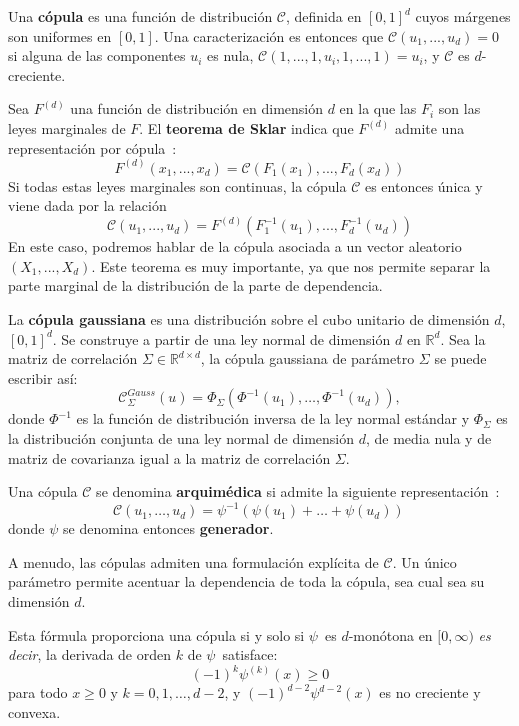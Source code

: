 \begin{f}[Cópula]
	Una \textbf{cópula} es una función de distribución  \(\mathcal{C}\), definida en \([0,1]^d\) cuyos márgenes son uniformes en \([0,1]\). 
	Una caracterización es entonces que \(\mathcal{C}(u_1,...,u_d)=0\) si alguna de las componentes \(u_i\) es nula, \(\mathcal{C}(1,...,1,u_i,1,...,1)=u_i\), y \(\mathcal{C}\) es \(d\)-creciente.
	\medskip
	
	Sea \(F^{(d)}\) una función de distribución en dimensión \(d\) en la que las \(F_i\) son las leyes marginales de \(F\). 
%	
	El\textbf{ teorema de Sklar} indica que \(F^{(d)}\) admite una representación por cópula~:
	\[
	F^{(d)} (x_1,...,x_d) = \mathcal{C} (F_1(x_1),...,F_d(x_d))
	\]
	Si todas estas leyes marginales son continuas, la cópula \(\mathcal{C}\) es entonces única y viene dada por la relación 
	\[
	\mathcal{C}(u_1,...,u_d)=F^{(d)}(F_1^{-1} (u_1),...,F_d^{-1} (u_d))
	\]
	En este caso, podremos hablar de la cópula asociada a un vector aleatorio \((X_1,..., X_d)\).    
	Este teorema es muy importante, ya que nos permite separar la parte marginal de la distribución de la parte de dependencia. 
	\medskip
	
	La \textbf{cópula gaussiana} es una distribución sobre el cubo unitario de dimensión \(d\), \([0,1]^d\). 
	Se construye a partir de una ley normal de dimensión \(d\) en  \(\mathbb{R}^d\).
%	
	Sea la matriz de correlación  \(\Sigma\in\mathbb{R}^{d\times d}\), la cópula gaussiana de parámetro  \(\Sigma\) se puede escribir así:
	\[
	\mathcal{C}_\Sigma^{Gauss}(u) = \Phi_\Sigma\left(\Phi^{-1}(u_1),\dots, \Phi^{-1}(u_d) \right), 
	\]
	donde \(\Phi^{-1}\) es la función de distribución inversa de la ley normal estándar y  \(\Phi_\Sigma\) es la distribución conjunta de una ley normal de dimensión \(d\), de media nula y de matriz de covarianza igual a la matriz de correlación  \(\Sigma\).
	\medskip	
	
	Una cópula \(\mathcal{C}\) se denomina \textbf{arquimédica} si admite la siguiente representación~:
	\[
	\mathcal{C}(u_1,\dots,u_d) = \psi^{-1}\left(\psi(u_1)+\dots+\psi(u_d)\right)\,
	\]
	donde \(\psi\) se denomina entonces \textbf{generador}.
	
	A menudo, las cópulas admiten una formulación explícita de \(\mathcal{C}\). 
	Un único parámetro permite acentuar la dependencia de toda la cópula, sea cual sea su dimensión \(d\).
	
	
	Esta fórmula proporciona una cópula si y solo si \(\psi\,\) es \(d\)-monótona en \([0,\infty)\) \emph{es decir}, la derivada de orden \(k\) de \(\psi\,\) satisface:
	\[
	(-1)^k\psi^{(k)}(x) \geq 0
	\]
	para todo \(x\geq 0\) y \(k=0,1,\dots,d-2\), y \((-1)^{d-2}\psi^{d-2}(x)\) es no creciente y convexa.
	\medskip
	

\end{f}
